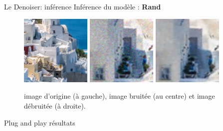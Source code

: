\documentclass[11pt]{beamer}
\begin{document}
\begin{frame}{Le Denoiser: inférence}
    Inférence du modèle : \textbf{Rand}
    \begin{figure}[b]
        \centering
        \includegraphics[width=0.30\textwidth]{../images/original/0823.png}
        \includegraphics[width=0.30\textwidth]{../images/random_blured/0823.png}
        \includegraphics[width=0.30\textwidth]{../images/random_infer/0823.png}
        \caption{image d'origine (à gauche), image bruitée (au centre) et image débruitée (à droite).}
    \end{figure}
\end{frame}

\begin{frame}{Plug and play}
    résultats
\end{frame}
\end{document}
